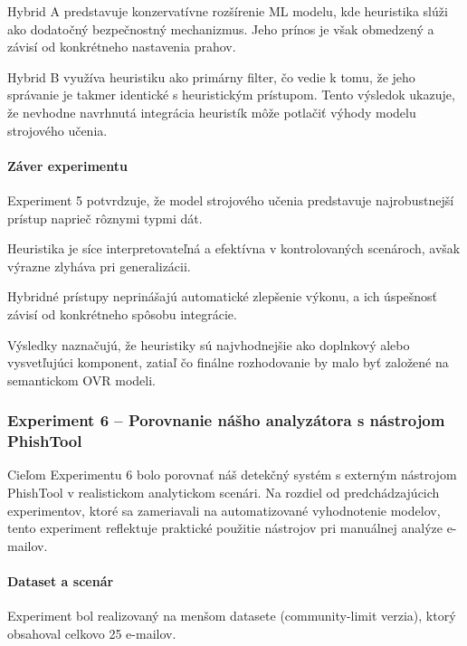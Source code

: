 \documentclass[conference]{IEEEtran}
\begin{document}
Hybrid A predstavuje konzervatívne rozšírenie ML modelu,
kde heuristika slúži ako dodatočný bezpečnostný mechanizmus.
Jeho prínos je však obmedzený a závisí od konkrétneho nastavenia prahov.

Hybrid B využíva heuristiku ako primárny filter,
čo vedie k tomu, že jeho správanie je takmer identické
s heuristickým prístupom. Tento výsledok ukazuje,
že nevhodne navrhnutá integrácia heuristík môže potlačiť
výhody modelu strojového učenia.

\paragraph{Záver experimentu}

Experiment 5 potvrdzuje, že model strojového učenia predstavuje
najrobustnejší prístup naprieč rôznymi typmi dát.

Heuristika je síce interpretovateľná a efektívna v kontrolovaných scenároch,
avšak výrazne zlyháva pri generalizácii.

Hybridné prístupy neprinášajú automatické zlepšenie výkonu,
a ich úspešnosť závisí od konkrétneho spôsobu integrácie.

Výsledky naznačujú, že heuristiky sú najvhodnejšie ako doplnkový
alebo vysvetľujúci komponent, zatiaľ čo finálne rozhodovanie
by malo byť založené na semantickom OVR modeli.


\subsubsection{Experiment 6 – Porovnanie nášho analyzátora s nástrojom PhishTool}

Cieľom Experimentu 6 bolo porovnať náš detekčný systém s externým nástrojom
PhishTool v realistickom analytickom scenári. Na rozdiel od predchádzajúcich
experimentov, ktoré sa zameriavali na automatizované vyhodnotenie modelov,
tento experiment reflektuje praktické použitie nástrojov pri manuálnej
analýze e-mailov.

\paragraph{Dataset a scenár}

Experiment bol realizovaný na menšom datasete (community-limit verzia),
ktorý obsahoval celkovo 25 e-mailov.
\end{document}
